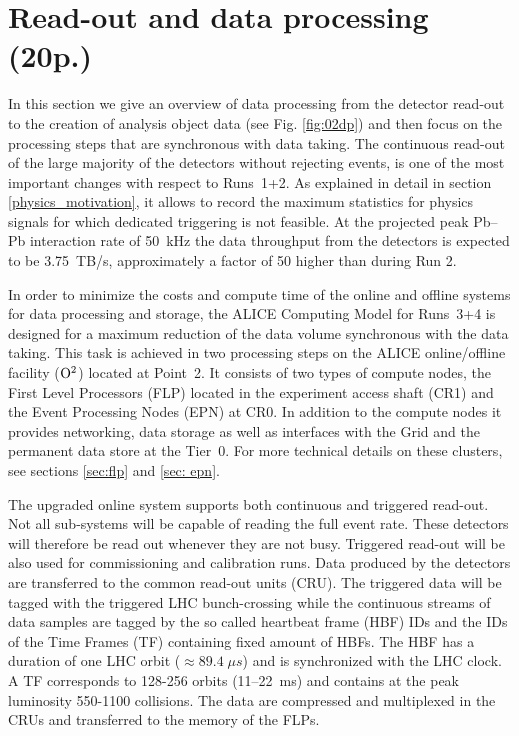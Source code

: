 \section{Read-out and data processing (20p.)}
In this section we give an overview of data processing from the detector read-out to the creation of analysis object data (see Fig. \ref{fig:02dp})
and then
focus on the processing steps that are synchronous with data taking.
The continuous read-out of the large majority of the detectors without rejecting 
events, is one of the most important changes with respect to Runs~1+2. As explained in 
detail in section \ref{physics_motivation}, it allows to 
record the maximum statistics for physics signals for which dedicated triggering is 
not feasible. At the projected peak Pb--Pb interaction rate of 50~kHz the data throughput from the detectors is expected to be {\color{blue} 3.75~TB/s}, approximately a factor of 50 higher than during Run 2.

In order to minimize the costs and compute time of the online and offline systems
for data processing and storage, the ALICE Computing Model for Runs~3+4 is designed 
for a maximum reduction of the data volume synchronous with the data taking. 
This task is achieved in two processing steps on the ALICE online/offline facility (${\rm O}^2$) located at Point~2.
It consists of two types of compute nodes, the First Level Processors (FLP) located in
the experiment access shaft (CR1) and the Event Processing Nodes (EPN) at CR0. In
addition to the compute
nodes it provides networking, data storage as well as interfaces with the Grid and the
permanent data
store at the Tier~0. For more technical details on these clusters, see sections
\ref{sec:flp} and \ref{sec: epn}.

The upgraded online system supports both continuous and triggered read-out. Not
all sub-systems will be capable of reading the full event rate. These detectors will
therefore be read out whenever they are not busy. Triggered read-out will be also used for commissioning and calibration runs. Data produced by the detectors are transferred to the common read-out units (CRU). The triggered data will be tagged with the triggered LHC bunch-crossing while the continuous streams of data samples are tagged by the so called heartbeat frame (HBF) IDs and the IDs of the Time Frames (TF) containing fixed amount of HBFs.
The HBF has a duration of one LHC orbit ($\approx 89.4\; \mu s$) and is synchronized with the LHC clock. A TF corresponds to 128-256 orbits (11--22~ms) and contains at the peak luminosity 550-1100 collisions.
The data are compressed and multiplexed
in the CRUs and transferred to the memory of the FLPs.

